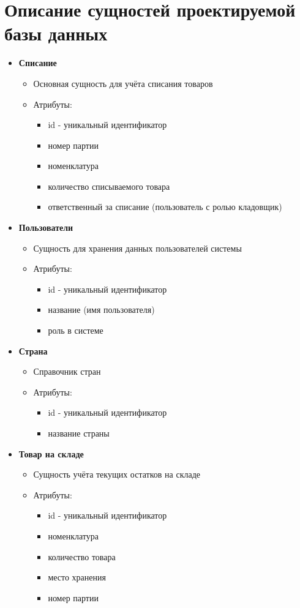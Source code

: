 \section{Описание сущностей проектируемой базы данных}
\begin{itemize}
	\item \textbf{Списание}
	\begin{itemize}
		\item Основная сущность для учёта списания товаров
		\item Атрибуты:
		\begin{itemize}
			\item id - уникальный идентификатор
			\item номер партии
			\item номенклатура
			\item количество списываемого товара
			\item ответственный за списание (пользователь с ролью кладовщик)
		\end{itemize}
	\end{itemize}
	
	\item \textbf{Пользователи}
	\begin{itemize}
		\item Сущность для хранения данных пользователей системы
		\item Атрибуты:
		\begin{itemize}
			\item id - уникальный идентификатор
			\item название (имя пользователя)
			\item роль в системе
		\end{itemize}
	\end{itemize}
	
	\item \textbf{Страна}
	\begin{itemize}
		\item Справочник стран
		\item Атрибуты:
		\begin{itemize}
			\item id - уникальный идентификатор
			\item название страны
		\end{itemize}
	\end{itemize}
	
	\item \textbf{Товар на складе}
	\begin{itemize}
		\item Сущность учёта текущих остатков на складе
		\item Атрибуты:
		\begin{itemize}
			\item id - уникальный идентификатор
			\item номенклатура
			\item количество товара
			\item место хранения
			\item номер партии
		\end{itemize}
	\end{itemize}
	

\end{itemize}
